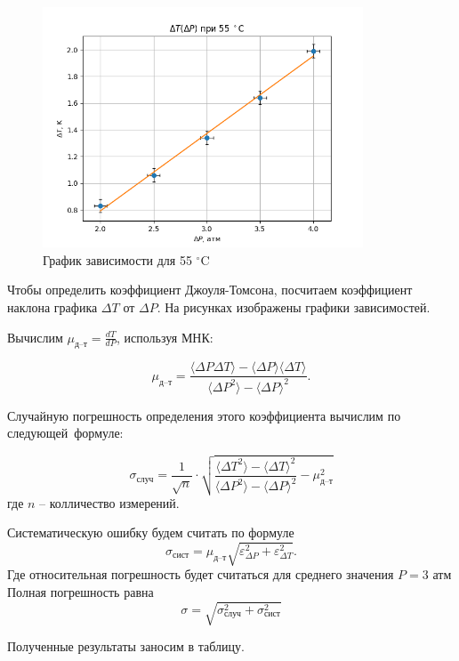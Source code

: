 \documentclass[a4paper,12pt]{article}
\begin{document}
\begin{figure}[H]
    \centering
    \includegraphics[width=0.85\textwidth]{5.png}
    \caption{График зависимости для 55 $^\circ$C}
\end{figure}

Чтобы определить коэффициент Джоуля-Томсона, посчитаем коэффициент наклона графика $\Delta T$ от $\Delta P$. На рисунках изображены графики зависимостей.

Вычислим $ \mu_\text{д--т} = \frac{dT}{dP} $, используя МНК:

\[ \mu_\text{д--т} = \frac{\langle \Delta P \Delta T \rangle - \langle \Delta P \rangle \langle \Delta T \rangle}{\langle \Delta P^2 \rangle - \langle \Delta P \rangle ^2}.\]

Случайную погрешность определения этого коэффициента вычислим по следующей~формуле:

\[ \sigma_{случ} = \frac{1}{\sqrt{n}} \cdot \sqrt{\frac{\langle \Delta T^2 \rangle - \langle \Delta T \rangle^2}{\langle \Delta P^2 \rangle - \langle \Delta P \rangle ^2} - \mu_\text{д--т}^2}\] где  $ n $  -- колличество измерений.

Систематическую ошибку будем считать по формуле 
\[ \sigma_\text{сист} = {\mu_\text{д--т}}\sqrt{\varepsilon^2_{\Delta P}+\varepsilon^2_{\Delta T}}.\]
Где относительная погрешность будет считаться для среднего значения $P = 3\text{ атм}$ \\
Полная погрешность равна 
\[ \sigma = \sqrt{\sigma_{случ}^2 + \sigma_\text{сист}^2} \]
\par Полученные результаты заносим в таблицу.
\end{document}
